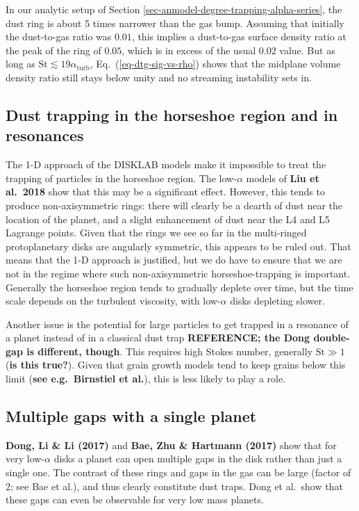 \documentclass{aa}
\begin{document}
In our analytic setup of Section \ref{sec-anmodel-degree-trapping-alpha-series},
the dust ring is about 5 times narrower than the gas bump. Assuming that
initially the dust-to-gas ratio was $0.01$, this implies a dust-to-gas surface
density ratio at the peak of the ring of $0.05$, which is in excess of the usual
$0.02$ value. But as long as $\mathrm{St}\lesssim 19\alpha_{\mathrm{turb}}$,
Eq.~(\ref{eq-dtg-sig-vs-rho}) shows that the midplane volume density ratio still
stays below unity and no streaming instability sets in.


\subsection{Dust trapping in the horseshoe region and in resonances}
The 1-D approach of the {\sf DISKLAB} models make it impossible to treat the
trapping of particles in the horseshoe region. The low-$\alpha$ models of {\bf
  Liu et al.~2018} show that this may be a significant effect. However, this
tends to produce non-axisymmetric rings: there will clearly be a dearth of dust
near the location of the planet, and a slight enhancement of dust near the L4
and L5 Lagrange points. Given that the rings we see so far in the multi-ringed
protoplanetary disks are angularly symmetric, this appears to be ruled out.
That means that the 1-D approach is justified, but we do have to ensure that we
are not in the regime where such non-axisymmetric horseshoe-trapping is
important. Generally the horseshoe region tends to gradually deplete over time,
but the time scale depends on the turbulent viscosity, with low-$\alpha$ disks
depleting slower. 

Another issue is the potential for large particles to get trapped in a
resonance of a planet instead of in a classical dust trap {\bf REFERENCE;
the Dong double-gap is different, though}.
This requires high Stokes number, generally $\mathrm{St}\gg 1$ ({\bf is
  this true?}). Given that grain growth models tend to keep grains below
this limit ({\bf see e.g.~Birnstiel et al.}), this is less likely to play
a role.

\subsection{Multiple gaps with a single planet}
{\bf Dong, Li \& Li (2017)} and 
{\bf Bae, Zhu \& Hartmann (2017)} show that for very low-$\alpha$ disks
a planet can open multiple gaps in the disk rather than just a single one.
The contrast of these rings and gaps in the gas can be large (factor of 2; see
Bae et al.),
and thus clearly constitute dust traps. Dong et al.\ show that these gaps
can even be observable for very low mass planets.
\end{document}
